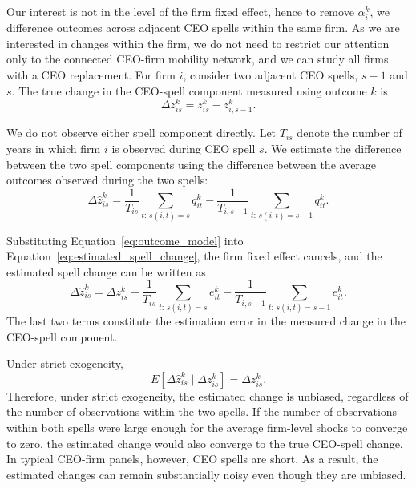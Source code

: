 \documentclass[11pt,a4paper]{article}
\begin{document}
Our interest is not in the level of the firm fixed effect, hence to remove $\alpha_i^{k}$, we difference outcomes across adjacent CEO spells within the same firm. As we are interested in changes within the firm, we do not need to restrict our attention only to the connected CEO-firm mobility network, and we can study all firms with a CEO replacement. For firm $i$, consider two adjacent CEO spells, $s-1$ and $s$. The
true change in the CEO-spell component measured using outcome $k$ is
\begin{equation}
\Delta z_{is}^{k}
=
z_{is}^{k}
-
z_{i,s-1}^{k}.
\label{eq:true_spell_change}
\end{equation}

We do not observe either spell component directly. Let $T_{is}$
denote the number of years in which firm $i$ is observed during CEO
spell $s$. We estimate the difference between the two spell components
using the difference between the average outcomes observed during the
two spells:
\begin{equation}
\Delta\widehat z_{is}^{k}
=
\frac{1}{T_{is}}
\sum_{t:\,s(i,t)=s}
q_{it}^{k}
-
\frac{1}{T_{i,s-1}}
\sum_{t:\,s(i,t)=s-1}
q_{it}^{k}.
\label{eq:estimated_spell_change}
\end{equation}

Substituting Equation~\eqref{eq:outcome_model} into
Equation~\eqref{eq:estimated_spell_change}, the firm fixed effect
cancels, and the estimated spell change can be written as
\begin{equation}
\Delta\widehat z_{is}^{k}
=
\Delta z_{is}^{k}
+
\frac{1}{T_{is}}
\sum_{t:\,s(i,t)=s}
e_{it}^{k}
-
\frac{1}{T_{i,s-1}}
\sum_{t:\,s(i,t)=s-1}
e_{it}^{k}.
\label{eq:spell_change_error}
\end{equation}
The last two terms constitute the estimation error in the measured
change in the CEO-spell component.

Under strict exogeneity,
\begin{equation}
E\!\left[
\Delta\widehat z_{is}^{k}
\mid
\Delta z_{is}^{k}
\right]
=
\Delta z_{is}^{k}.
\label{eq:unbiased_spell_change}
\end{equation}
Therefore, under strict exogeneity, the estimated change is unbiased, regardless of the number of observations within the two spells. If the
number of observations within both spells were large enough for the
average firm-level shocks to converge to zero, the estimated change
would also converge to the true CEO-spell change. In typical CEO-firm
panels, however, CEO spells are short. As a result, the estimated
changes can remain substantially noisy even though they are unbiased.
\end{document}
